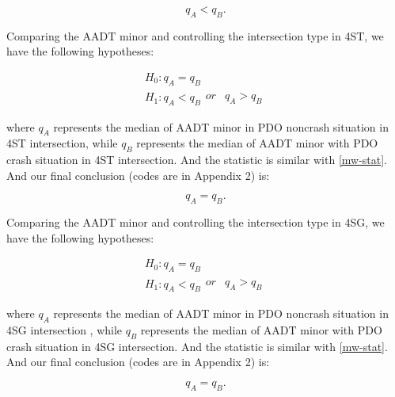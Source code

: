 \documentclass[11pt]{scrartcl} %
\begin{document}
\begin{equation*}
{q_A} < {q_B}.
\end{equation*}

\par

Comparing the AADT minor and controlling the intersection type in 4ST, we have the following hypotheses:

\begin{equation*}
\begin{array}{l}
{H_0}:{q_A} = {q_B}\\
{H_1}:{q_A} < {q_B}\begin{array}{*{20}{c}}
{or}&{{q_A} > {q_B}}
\end{array}
\end{array}
\end{equation*}

where $q_A$ represents the median of AADT minor in PDO noncrash situation in 4ST intersection, while $q_B$ represents the median of AADT minor with PDO crash situation in 4ST intersection. And the statistic is similar with \eqref{mw-stat}. And our final conclusion (codes are in Appendix 2) is:

\begin{equation*}
{q_A} = {q_B}.
\end{equation*}

\par

Comparing the AADT minor and controlling the intersection type in 4SG, we have the following hypotheses:

\begin{equation*}
\begin{array}{l}
{H_0}:{q_A} = {q_B}\\
{H_1}:{q_A} < {q_B}\begin{array}{*{20}{c}}
{or}&{{q_A} > {q_B}}
\end{array}
\end{array}
\end{equation*}

where $q_A$ represents the median of AADT minor in PDO noncrash situation in 4SG intersection , while $q_B$ represents the median of AADT minor with PDO crash situation in 4SG intersection. And the statistic is similar with \eqref{mw-stat}. And our final conclusion (codes are in Appendix 2) is:

\begin{equation*}
{q_A} = {q_B}.
\end{equation*}
\end{document}
